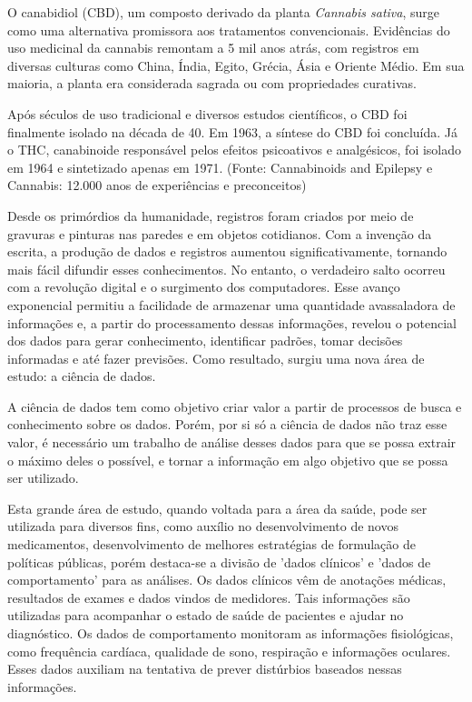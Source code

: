 \documentclass[article,a4paper,12pt,brazil,sumario=tradicional]{abntex2}
\begin{document}
O canabidiol (CBD), um composto derivado da planta \textit{Cannabis sativa}, surge como uma alternativa promissora aos tratamentos convencionais. Evidências do uso medicinal da cannabis remontam a 5 mil anos atrás, com registros em diversas culturas como China, Índia, Egito, Grécia, Ásia e Oriente Médio. Em sua maioria, a planta era considerada sagrada ou com propriedades curativas.

Após séculos de uso tradicional e diversos estudos científicos, o CBD foi finalmente isolado na década de 40. Em 1963, a síntese do CBD foi concluída. Já o THC, canabinoide responsável pelos efeitos psicoativos e analgésicos, foi isolado em 1964 e sintetizado apenas em 1971. (Fonte: Cannabinoids and Epilepsy e Cannabis: 12.000 anos de experiências e preconceitos)

Desde os primórdios da humanidade, registros foram criados por meio de gravuras e pinturas nas paredes e em objetos cotidianos. Com a invenção da escrita, a produção de dados e registros aumentou significativamente, tornando mais fácil difundir esses conhecimentos. No entanto, o verdadeiro salto ocorreu com a revolução digital e o surgimento dos computadores. Esse avanço exponencial permitiu a facilidade de armazenar uma quantidade avassaladora de informações e, a partir do processamento dessas informações, revelou o potencial dos dados para gerar conhecimento, identificar padrões, tomar decisões informadas e até fazer previsões. Como resultado, surgiu uma nova área de estudo: a ciência de dados.

A ciência de dados tem como objetivo criar valor a partir de processos de busca e conhecimento sobre os dados. Porém, por si só a ciência de dados não traz esse valor, é necessário um trabalho de análise desses dados para que se possa extrair o máximo deles o possível, e tornar a informação em algo objetivo que se possa ser utilizado.

Esta grande área de estudo, quando voltada para a área da saúde, pode ser utilizada para diversos fins, como auxílio no desenvolvimento de novos medicamentos, desenvolvimento de melhores estratégias de formulação de políticas públicas, porém destaca-se a divisão de 'dados clínicos' e 'dados de comportamento' para as análises. Os dados clínicos vêm de anotações médicas, resultados de exames e dados vindos de medidores. Tais informações são utilizadas para acompanhar o estado de saúde de pacientes e ajudar no diagnóstico. Os dados de comportamento monitoram as informações fisiológicas, como frequência cardíaca, qualidade de sono, respiração e informações oculares. Esses dados auxiliam na tentativa de prever distúrbios baseados nessas informações.
\end{document}
